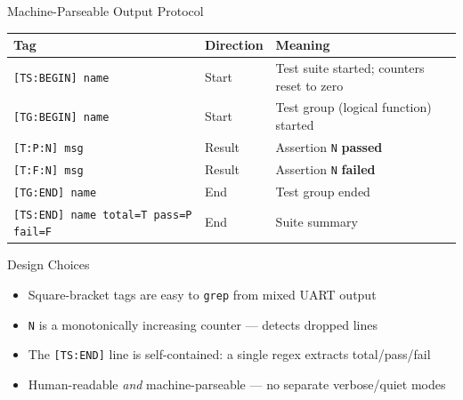 \documentclass[aspectratio=169, 10pt]{beamer}
\begin{document}
\begin{frame}[fragile]{Machine-Parseable Output Protocol}
\begin{table}
\centering
\small
\begin{tabular}{@{}llp{7.5cm}@{}}
\toprule
\textbf{Tag} & \textbf{Direction} & \textbf{Meaning} \\
\midrule
\texttt{[TS:BEGIN] name}  & Start & Test suite started; counters reset to zero \\
\texttt{[TG:BEGIN] name}  & Start & Test group (logical function) started \\
\texttt{[T:P:N] msg}      & Result & Assertion \texttt{N} \textbf{passed} \\
\texttt{[T:F:N] msg}      & Result & Assertion \texttt{N} \textbf{failed} \\
\texttt{[TG:END] name}    & End & Test group ended \\
\texttt{[TS:END] name total=T pass=P fail=F} & End & Suite summary \\
\bottomrule
\end{tabular}
\end{table}

\vspace{0.3em}
\begin{block}{Design Choices}
\begin{itemize}
  \item Square-bracket tags are easy to \texttt{grep} from mixed UART output
  \item \texttt{N} is a monotonically increasing counter --- detects dropped lines
  \item The \texttt{[TS:END]} line is self-contained: a single regex extracts total/pass/fail
  \item Human-readable \emph{and} machine-parseable --- no separate verbose/quiet modes
\end{itemize}
\end{block}
\end{frame}
\end{document}
